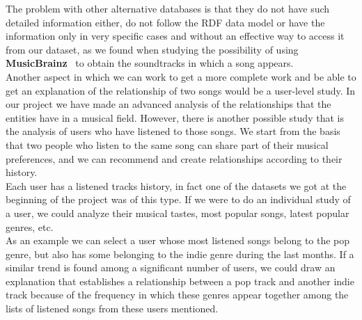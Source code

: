 The problem with other alternative databases is that they do not have such detailed information either, do not follow the RDF data model or have the information only in very specific cases and without an effective way to access it from our dataset, as we found when studying the possibility of using \textbf{MusicBrainz}~\cite{musicbrainz} to obtain the soundtracks in which a song appears.\\

Another aspect in which we can work to get a more complete work and be able to get an explanation of the relationship of two songs would be a user-level study. In our project we have made an advanced analysis of the relationships that the entities have in a musical field. However, there is another possible study that is the analysis of users who have listened to those songs. We start from the basis that two people who listen to the same song can share part of their musical preferences, and we can recommend and create relationships according to their history.\\

Each user has a listened tracks history, in fact one of the datasets we got at the beginning of the project was of this type. If we were to do an individual study of a user, we could analyze their musical tastes, most popular songs, latest popular genres, etc.\\

As an example we can select a user whose most listened songs belong to the pop genre, but also has some belonging to the indie genre during the last months. If a similar trend is found among a significant number of users, we could draw an explanation that establishes a relationship between a pop track and another indie track because of the frequency in which these genres appear together among the lists of listened songs from these users mentioned.\\